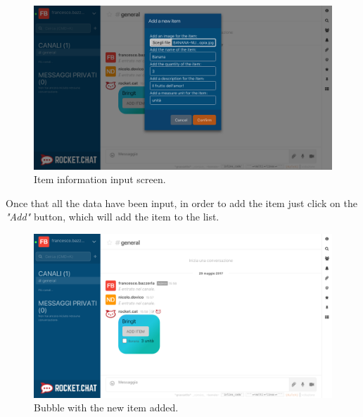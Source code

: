 \begin{figure}[H]
  \centering 
  \includegraphics[width=\textwidth]{Sections/3-HowToUse/Images/item_add_filled.png}
  \caption{Item information input screen.}
\end{figure}

Once that all the data have been input, in order to add the item just click on the \textit{"Add"} button, which will add the item to the list.

\begin{figure}[H]
  \centering 
  \includegraphics[width=\textwidth]{Sections/3-HowToUse/Images/bubble_item_added.png}
  \caption{Bubble with the new item added.}
\end{figure}
